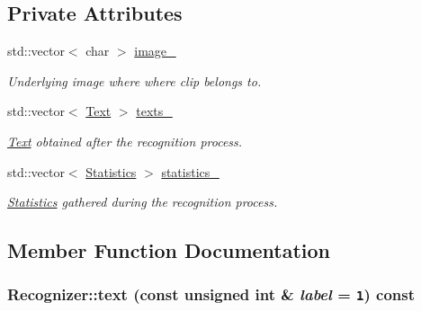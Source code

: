 \subsection*{Private Attributes}
\begin{CompactItemize}
\item 
\hypertarget{class_recognizer_42f0086ccc14ef1295702884e85c4693}{
std::vector$<$ char $>$ \hyperlink{class_recognizer_42f0086ccc14ef1295702884e85c4693}{image\_\-}}
\label{class_recognizer_42f0086ccc14ef1295702884e85c4693}

\begin{CompactList}\small\item\em Underlying image where where clip belongs to. \item\end{CompactList}\item 
\hypertarget{class_recognizer_853b3b92f3e02587e949acba44ec0e2e}{
std::vector$<$ \hyperlink{class_text}{Text} $>$ \hyperlink{class_recognizer_853b3b92f3e02587e949acba44ec0e2e}{texts\_\-}}
\label{class_recognizer_853b3b92f3e02587e949acba44ec0e2e}

\begin{CompactList}\small\item\em \hyperlink{class_text}{Text} obtained after the recognition process. \item\end{CompactList}\item 
\hypertarget{class_recognizer_c30a3d75c7c7cc3b3422f5aa4f594b5a}{
std::vector$<$ \hyperlink{class_statistics}{Statistics} $>$ \hyperlink{class_recognizer_c30a3d75c7c7cc3b3422f5aa4f594b5a}{statistics\_\-}}
\label{class_recognizer_c30a3d75c7c7cc3b3422f5aa4f594b5a}

\begin{CompactList}\small\item\em \hyperlink{class_statistics}{Statistics} gathered during the recognition process. \item\end{CompactList}\end{CompactItemize}


\subsection{Member Function Documentation}
\hypertarget{class_recognizer_343b5b6f98ab483fd239ecddb9b43f2d}{
\subsubsection[text]{ Recognizer::text (const unsigned int \& {\em label} = {\tt 1}) const}}
\label{class_recognizer_343b5b6f98ab483fd239ecddb9b43f2d}


